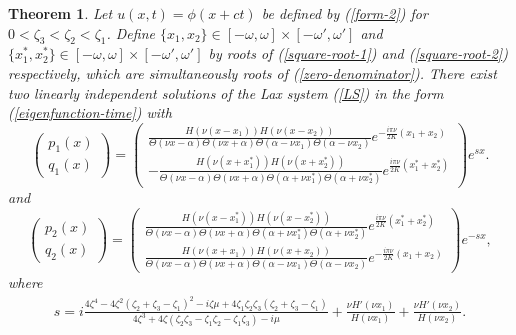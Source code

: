 \documentclass[12pt,reqno]{amsart}
\numberwithin{equation}{section}
\newtheorem{theorem}{Theorem}
\begin{document}
\begin{theorem}
	\label{th-factorizaton}
	Let $u(x,t) = \phi(x+ct)$ be defined by (\ref{form-2}) for $0 < \zeta_3 < \zeta_2 < \zeta_1$. Define $\{ x_1,x_2\}  \in [-\omega,\omega] \times [-\omega',\omega']$ and $\{ x_1^*,x_2^*\}  \in [-\omega,\omega] \times [-\omega',\omega']$ by roots of (\ref{square-root-1}) and (\ref{square-root-2}) respectively, which are simultaneously roots of (\ref{zero-denominator}). There exist two linearly independent solutions of the Lax system (\ref{LS}) in the form (\ref{eigenfunction-time}) with 
	\begin{equation}
	\label{p-gen}
	\left( \begin{matrix} p_1(x)  \\ q_1(x) \end{matrix} \right) = 
	\left( \begin{matrix} 
	\frac{H(\nu (x-x_1)) H(\nu (x-x_2))}{\Theta(\nu x-\alpha) \Theta(\nu x+ \alpha) \Theta(\alpha - \nu x_1) \Theta(\alpha - \nu x_2)} e^{-\frac{i\pi \nu}{2K} (x_1 + x_2)} \\ -
	\frac{H(\nu (x+x_1^*)) H(\nu (x+x_2^*))}{\Theta(\nu x-\alpha) \Theta(\nu x+ \alpha) \Theta(\alpha + \nu x_1^*) \Theta(\alpha + \nu x_2^*)} e^{\frac{i\pi \nu}{2K} (x_1^* + x_2^*)} \end{matrix} \right) e^{s x}.
	\end{equation}
	and
	\begin{equation}
	\label{p-gen-1}
	\left( \begin{matrix} p_2(x) \\ q_2(x) \end{matrix} \right) = 
	\left( \begin{matrix}
	\frac{H(\nu (x-x_1^*)) H(\nu (x-x_2^*))}{\Theta(\nu x-\alpha) \Theta(\nu x+ \alpha) \Theta(\alpha + \nu x_1^*) \Theta(\alpha + \nu x_2^*)} e^{\frac{i\pi \nu}{2K} (x_1^* + x_2^*)} \\
	\frac{H(\nu (x+x_1)) H(\nu (x+x_2))}{\Theta(\nu x-\alpha) \Theta(\nu x+ \alpha) \Theta(\alpha - \nu x_1) \Theta(\alpha - \nu x_2)} e^{-\frac{i\pi \nu }{2K} (x_1 + x_2)} \end{matrix} \right) e^{-s x},
	\end{equation}
	where
\begin{align}
s = i \frac{4 \zeta^4 - 4 \zeta^2 (\zeta_2 + \zeta_3 - \zeta_1)^2 
	- i \zeta \mu + 4 \zeta_1 \zeta_2 \zeta_3 (\zeta_2 + \zeta_3 - \zeta_1)}{4 \zeta^3 +4  \zeta (\zeta_2 \zeta_3 - \zeta_1 \zeta_2 - \zeta_1 \zeta_3) - i \mu} 
+ \frac{\nu H'(\nu x_1)}{H(\nu x_1)} + \frac{\nu H'(\nu x_2)}{H(\nu x_2)}.
\label{s-final}
\end{align}	
\end{theorem}
\end{document}
